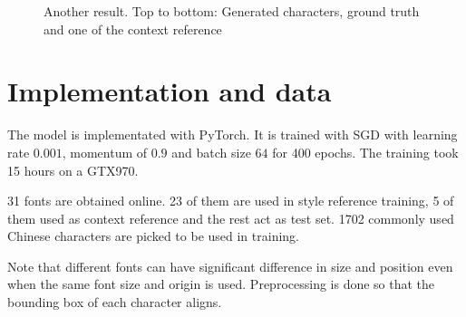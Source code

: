 \documentclass[10pt,twocolumn,letterpaper]{article}
\begin{document}
\begin{figure}[t]
\begin{center}
	\end{center}
	\caption{Another result. Top to bottom: Generated characters, ground truth and one of the context reference}
	\label{fig:long}
	\label{fig:onecol}
\end{figure}

\section{Implementation and data}
The model is implementated with PyTorch. It is trained with SGD with learning rate $0.001$, momentum of $0.9$ and batch size $64$ for 400 epochs. The training took 15 hours on a GTX970.

31 fonts are obtained online. 23 of them are used in style reference training, 5 of them used as context reference and the rest act as test set. 1702 commonly used Chinese characters are picked to be used in training.

Note that different fonts can have significant difference in size and position even when the same font size and origin is used. Preprocessing is done so that the bounding box of each character aligns.

{\small


}
\end{document}
